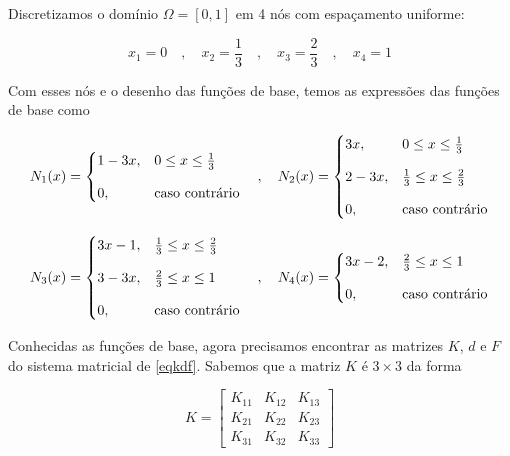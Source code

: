 \documentclass[12pt]{scrartcl}
\begin{document}
Discretizamos o domínio $\Omega = \left[0, 1\right]$ em 4 nós com espaçamento uniforme:

\[
    x_1 = 0 \quad , \quad x_2 = \frac{1}{3} \quad , \quad x_3 = \frac{2}{3} \quad , \quad x_4 = 1
\]

Com esses nós e o desenho das funções de base, temos as expressões das funções de base como

\[
    N_1(x) = \begin{cases}
        1 - 3x, & 0 \leq x \leq \frac{1}{3} \\
        \noalign{\vskip9pt}
        0,      & \textrm{caso contrário}
    \end{cases}
    \quad , \quad
    N_2(x) = \begin{cases}
        3x,     & 0 \leq x \leq \frac{1}{3}           \\
        \noalign{\vskip9pt}
        2 - 3x, & \frac{1}{3} \leq x \leq \frac{2}{3} \\
        \noalign{\vskip9pt}
        0,      & \textrm{caso contrário}
    \end{cases}
\]

\[
    N_3(x) = \begin{cases}
        3x - 1, & \frac{1}{3} \leq x \leq \frac{2}{3} \\
        \noalign{\vskip9pt}
        3 - 3x, & \frac{2}{3} \leq x \leq 1           \\
        \noalign{\vskip9pt}
        0,      & \textrm{caso contrário}
    \end{cases}
    \quad , \quad
    N_4(x) = \begin{cases}
        3x - 2, & \frac{2}{3} \leq x \leq 1 \\
        \noalign{\vskip9pt}
        0,      & \textrm{caso contrário}
    \end{cases}
\]

Conhecidas as funções de base, agora precisamos encontrar as matrizes $K$, $d$ e $F$ do sistema matricial de \eqref{eqkdf}.
Sabemos que a matriz $K$ é $3 \times 3$ da forma

\begingroup
\renewcommand*{\arraystretch}{2}

\[
    K =
    \begin{bmatrix}
        K_{11} & K_{12} & K_{13} \\
        K_{21} & K_{22} & K_{23} \\
        K_{31} & K_{32} & K_{33}
    \end{bmatrix}
\]

\endgroup
\end{document}
